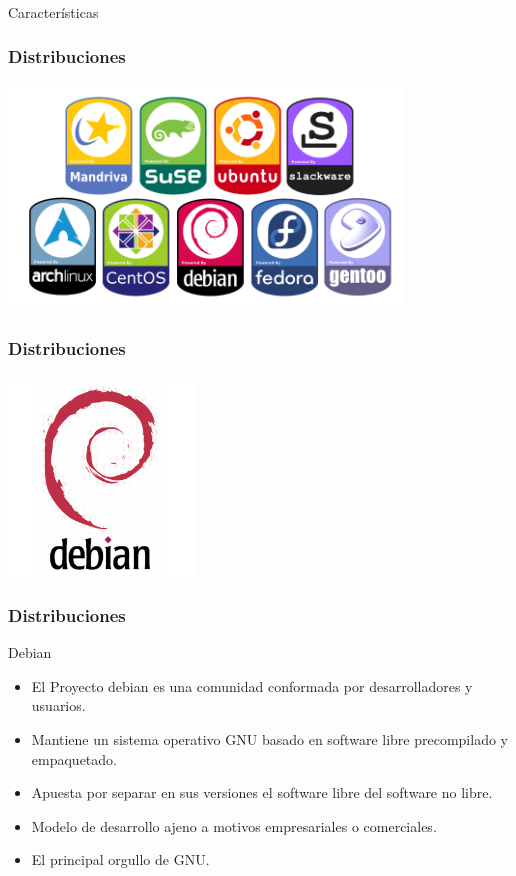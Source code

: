 \frame
{
\frametitle{}
\begin{center}
	\Huge{Características}
\end{center}
}
\frame
{
\frametitle{Distribuciones}
\begin{center}
	\includegraphics[width=10.5cm]{img/logos-linux}
\end{center}
}

\frame
{
\frametitle{Distribuciones}
\vspace{1cm}
\begin{center}
	\includegraphics[width=5cm]{img/debian}
\end{center}
}

\frame
{
\frametitle{Distribuciones}
\Large{Debian}
\normalsize
\begin{itemize}
	\item El Proyecto debian es una comunidad conformada por desarrolladores y usuarios.
	\item Mantiene un sistema operativo GNU basado en software libre precompilado y empaquetado.
	\item Apuesta por separar en sus versiones el software libre del software no libre.
	\item Modelo de desarrollo ajeno a motivos empresariales o comerciales.
	\item El principal orgullo de GNU.
\end{itemize}
}

